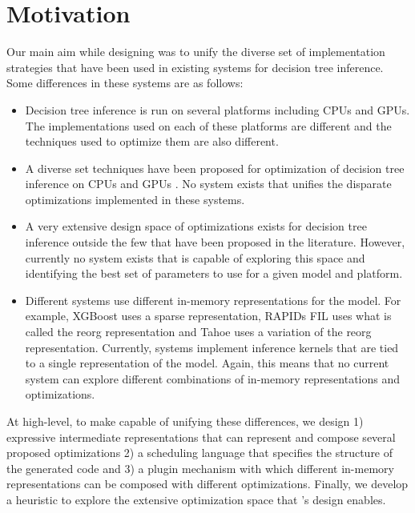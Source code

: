 \section{Motivation}

Our main aim while designing \Treebeard{} was to unify the diverse set of implementation
strategies that have been used in existing systems for decision tree inference. Some 
differences in these systems are as follows:
\begin{itemize}
  \item Decision tree inference is run on several platforms including CPUs and GPUs. The 
  implementations used on each of these platforms are different and the techniques used
  to optimize them are also different.
  \item A diverse set techniques have been proposed for optimization of decision tree 
  inference on CPUs and GPUs \cite{VPred, Tahoe, Treelite, XGBoost, Hummingbird, QuickScorer, FIL}. 
  No system exists that unifies the disparate optimizations implemented in these systems.
  \item A very extensive design space of optimizations exists for decision tree inference
  outside the few that have been proposed in the literature. However, currently no 
  system exists that is capable of exploring this space and identifying the best set 
  of parameters to use for a given model and platform.
  \item Different systems use different in-memory representations for the model. For example,
  XGBoost uses a sparse representation, RAPIDs FIL uses what is called the reorg representation 
  and Tahoe uses a variation of the reorg representation. Currently, systems implement 
  inference kernels that are tied to a single representation of the model. Again, this means
  that no current system can explore different combinations of in-memory representations 
  and optimizations.
\end{itemize}
At high-level, to make \Treebeard{} capable of unifying these differences, we design 1)  
expressive intermediate representations that can represent and compose several proposed 
optimizations 2) a scheduling language that specifies the structure of the
generated code and 3) a plugin mechanism with which different in-memory representations
can be composed with different optimizations. Finally, we develop a heuristic to
explore the extensive optimization space that \Treebeard{}'s design enables.
